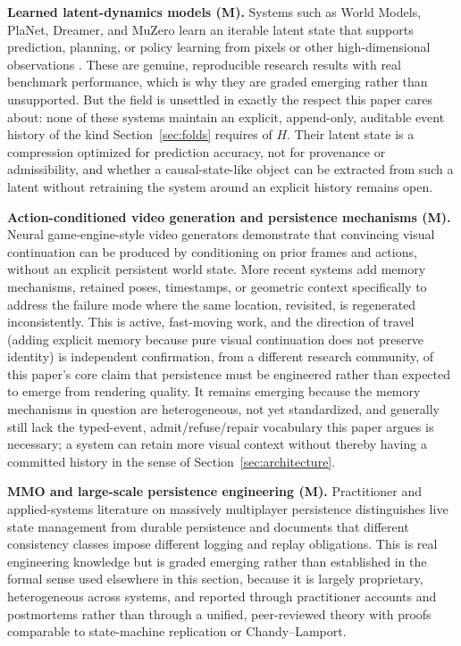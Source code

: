 \documentclass[11pt]{article}
\begin{document}
\textbf{Learned latent-dynamics models (M).} Systems such as World Models, PlaNet, Dreamer, and MuZero learn an iterable latent state that supports prediction, planning, or policy learning from pixels or other high-dimensional observations \cite{hasschmidhuber2018, hafner2019, hafner2020, schrittwieser2020}. These are genuine, reproducible research results with real benchmark performance, which is why they are graded emerging rather than unsupported. But the field is unsettled in exactly the respect this paper cares about: none of these systems maintain an explicit, append-only, auditable event history of the kind Section~\ref{sec:folds} requires of $H$. Their latent state is a compression optimized for prediction accuracy, not for provenance or admissibility, and whether a causal-state-like object can be extracted from such a latent without retraining the system around an explicit history remains open.

\textbf{Action-conditioned video generation and persistence mechanisms (M).} Neural game-engine-style video generators demonstrate that convincing visual continuation can be produced by conditioning on prior frames and actions, without an explicit persistent world state. More recent systems add memory mechanisms, retained poses, timestamps, or geometric context specifically to address the failure mode where the same location, revisited, is regenerated inconsistently. This is active, fast-moving work, and the direction of travel (adding explicit memory because pure visual continuation does not preserve identity) is independent confirmation, from a different research community, of this paper's core claim that persistence must be engineered rather than expected to emerge from rendering quality. It remains emerging because the memory mechanisms in question are heterogeneous, not yet standardized, and generally still lack the typed-event, admit/refuse/repair vocabulary this paper argues is necessary; a system can retain more visual context without thereby having a committed history in the sense of Section~\ref{sec:architecture}.

\textbf{MMO and large-scale persistence engineering (M).} Practitioner and applied-systems literature on massively multiplayer persistence distinguishes live state management from durable persistence and documents that different consistency classes impose different logging and replay obligations. This is real engineering knowledge but is graded emerging rather than established in the formal sense used elsewhere in this section, because it is largely proprietary, heterogeneous across systems, and reported through practitioner accounts and postmortems rather than through a unified, peer-reviewed theory with proofs comparable to state-machine replication or Chandy--Lamport.
\end{document}
